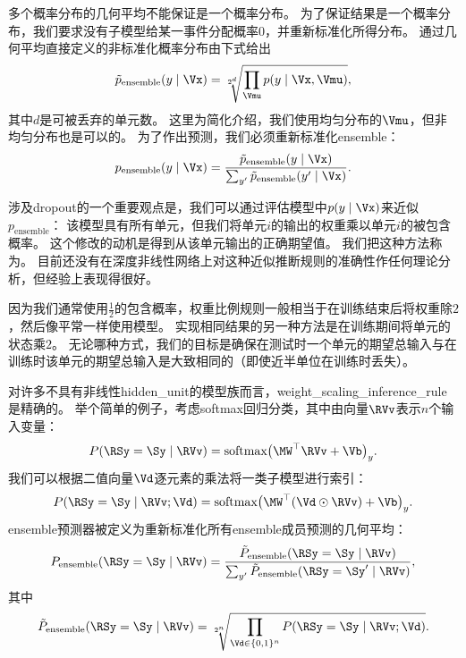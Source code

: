 多个概率分布的几何平均不能保证是一个概率分布。
为了保证结果是一个概率分布，我们要求没有子模型给某一事件分配概率0，并重新标准化所得分布。
通过几何平均直接定义的非标准化概率分布由下式给出
\begin{align}
\tilde{p}_{\text{ensemble}}(y \mid \Vx) = \sqrt[2^d]{\prod_{\Vmu} p(y \mid \Vx, \Vmu)},
\end{align}
其中$d$是可被丢弃的单元数。
这里为简化介绍，我们使用均匀分布的$\Vmu$，但非均匀分布也是可以的。
为了作出预测，我们必须重新标准化\gls{ensemble}：
\begin{align}
p_{\text{ensemble}}(y \mid \Vx)  = \frac{\tilde{p}_{\text{ensemble}}(y \mid \Vx)}
 {\sum_{y'}\tilde{p}_{\text{ensemble}}(y' \mid \Vx) }.
\end{align}
 
涉及\gls{dropout}的一个重要观点\citep{Hinton-et-al-arxiv2012}是，我们可以通过评估模型中$p(y \mid \Vx)$来近似$ p_{\text{ensemble}}$：
该模型具有所有单元，但我们将单元$i$的输出的权重乘以单元$i$的被包含概率。
这个修改的动机是得到从该单元输出的正确期望值。
我们把这种方法称为。
目前还没有在深度非线性网络上对这种近似推断规则的准确性作任何理论分析，但经验上表现得很好。

 
因为我们通常使用$\frac{1}{2}$的包含概率，权重比例规则一般相当于在训练结束后将权重除$2$，然后像平常一样使用模型。
实现相同结果的另一种方法是在训练期间将单元的状态乘$2$。
无论哪种方式，我们的目标是确保在测试时一个单元的期望总输入与在训练时该单元的期望总输入是大致相同的（即使近半单位在训练时丢失）。

对许多不具有非线性\gls{hidden_unit}的模型族而言，\gls{weight_scaling_inference_rule}是精确的。
举个简单的例子，考虑\gls{softmax}回归分类，其中由向量$\RVv$表示$n$个输入变量：
\begin{align}
 P(\RSy = \Sy \mid \RVv) = \text{softmax}\big(\MW^\top\RVv + \Vb\big)_y.
\end{align}
我们可以根据二值向量$\Vd$逐元素的乘法将一类子模型进行索引：
\begin{align}
P(\RSy = \Sy \mid \RVv; \Vd) = \text{softmax}\big(\MW^\top(\Vd \odot \RVv) + \Vb \big)_y.
\end{align}
\gls{ensemble}预测器被定义为重新标准化所有\gls{ensemble}成员预测的几何平均：
\begin{align} \label{eq:758pe}
P_{\text{ensemble}}(\RSy = \Sy \mid \RVv)  = \frac{\tilde{P}_{\text{ensemble}}(\RSy = \Sy \mid \RVv)}
 {\sum_{y'}\tilde{P}_{\text{ensemble}}(\RSy = \Sy' \mid \RVv) },
\end{align}
其中
\begin{align}
\tilde{P}_{\text{ensemble}}(\RSy=\Sy \mid \RVv) =
\sqrt[2^n]{\prod_{\Vd \in \{0,1\}^n} P(\RSy = \Sy \mid \RVv; \Vd)}.
\end{align}

